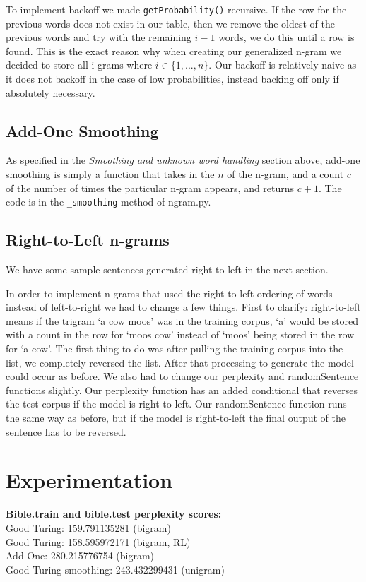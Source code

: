 \documentclass{article}
\begin{document}
To implement backoff we made \texttt{getProbability()} recursive. If the row for the previous words does not exist in our table, then we remove the oldest of the previous words and try with the remaining $i-1$ words, we do this until a row is found. This is the exact reason why when creating our generalized n-gram we decided to store all i-grams where $i \in \lbrace 1,...,n \rbrace$. Our backoff is relatively naive as it does not backoff in the case of low probabilities, instead backing off only if absolutely necessary.

\subsection{Add-One Smoothing}
As specified in the \emph{Smoothing and unknown word handling} section above, add-one smoothing is simply a function that takes in the $n$ of the n-gram, and a count $c$ of the number of times the particular n-gram appears, and returns $c+1$. The code is in the \texttt{\_smoothing} method of ngram.py.

\subsection{Right-to-Left n-grams}
We have some sample sentences generated right-to-left in the next section.\par
In order to implement n-grams that used the right-to-left ordering of words instead of left-to-right we had to change a few things. First to clarify: right-to-left means if the trigram `a cow moos' was in the training corpus, `a' would be stored with a count in the row for `moos cow' instead of `moos' being stored in the row for `a cow'. The first thing to do was after pulling the training corpus into the list, we completely reversed the list. After that processing to generate the model could occur as before. We also had to change our perplexity and randomSentence functions slightly. Our perplexity function has an added conditional that reverses the test corpus if the model is right-to-left. Our randomSentence function runs the same way as before, but if the model is right-to-left the final output of the sentence has to be reversed.

\section{Experimentation}

\textbf{Bible.train and bible.test perplexity scores:}\\
Good Turing: 159.791135281 (bigram)\\
Good Turing: 158.595972171 (bigram, RL)\\
Add One: 280.215776754 (bigram)\\
Good Turing smoothing: 243.432299431 (unigram)\par
\end{document}
